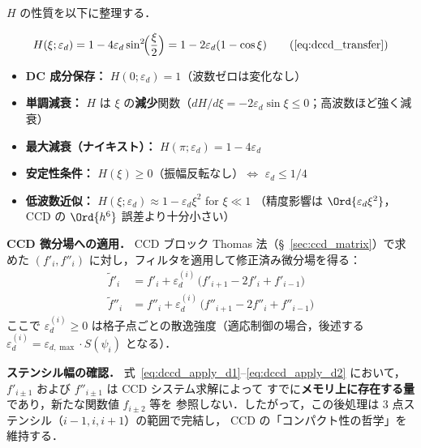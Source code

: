 $H$ の性質を以下に整理する．

\begin{tcolorbox}[resultbox, title={3 点フィルタ伝達関数 $H(\xi;\varepsilon_d)$ の性質}]
\label{box:filter_properties}
\begin{equation}
  H(\xi;\varepsilon_d) = 1 - 4\varepsilon_d\sin^2\!\Bigl(\frac{\xi}{2}\Bigr)
  = 1 - 2\varepsilon_d(1-\cos\xi)
  \tag{\ref{eq:dccd_transfer}}
\end{equation}
\begin{itemize}
  \item \textbf{DC 成分保存：} $H(0;\varepsilon_d) = 1$（波数ゼロは変化なし）
  \item \textbf{単調減衰：} $H$ は $\xi$ の\textbf{減少}関数（$dH/d\xi = -2\varepsilon_d\sin\xi \leq 0$；高波数ほど強く減衰）
  \item \textbf{最大減衰（ナイキスト）：} $H(\pi;\varepsilon_d) = 1 - 4\varepsilon_d$
  \item \textbf{安定性条件：} $H(\xi) \geq 0$（振幅反転なし）$\Leftrightarrow$ $\varepsilon_d \leq 1/4$
  \item \textbf{低波数近似：} $H(\xi;\varepsilon_d) \approx 1 - \varepsilon_d\xi^2$ for $\xi \ll 1$
        （精度影響は $\Ord{\varepsilon_d\xi^2}$，CCD の $\Ord{h^6}$ 誤差より十分小さい）
\end{itemize}
\end{tcolorbox}

\textbf{CCD 微分場への適用．}
CCD ブロック Thomas 法（§~\ref{sec:ccd_matrix}）で求めた
$(f'_i, f''_i)$ に対し，フィルタを適用して修正済み微分場を得る：
\begin{align}
  \tilde{f}'_i  &= f'_i  + \varepsilon_d^{(i)}\,\bigl(f'_{i+1}  - 2f'_i  + f'_{i-1}\bigr)
  \label{eq:dccd_apply_d1} \\
  \tilde{f}''_i &= f''_i + \varepsilon_d^{(i)}\,\bigl(f''_{i+1} - 2f''_i + f''_{i-1}\bigr)
  \label{eq:dccd_apply_d2}
\end{align}
ここで $\varepsilon_d^{(i)} \geq 0$ は格子点ごとの散逸強度（適応制御の場合，後述する
$\varepsilon_d^{(i)} = \varepsilon_{d,\max} \cdot S(\psi_i)$ となる）．

\textbf{ステンシル幅の確認．}
式~\eqref{eq:dccd_apply_d1}--\eqref{eq:dccd_apply_d2} において，
$f'_{i\pm1}$ および $f''_{i\pm1}$ は CCD システム求解によって
すでに\textbf{メモリ上に存在する量}であり，新たな関数値 $f_{i\pm2}$ 等を
参照しない．したがって，この後処理は 3 点ステンシル（$i-1, i, i+1$）の範囲で完結し，
CCD の「コンパクト性の哲学」を維持する．

